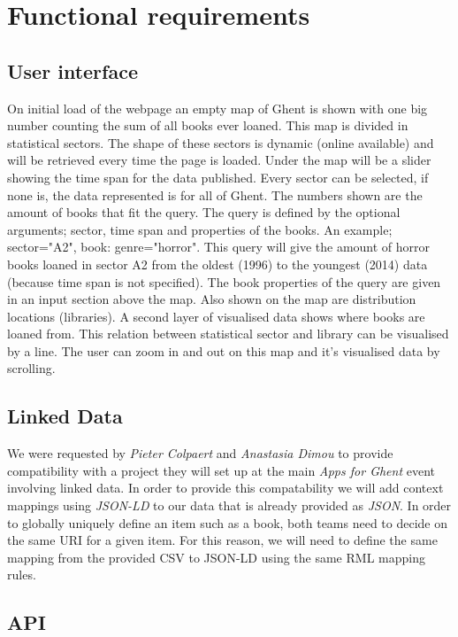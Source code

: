 \section{Functional requirements}

\subsection{User interface}

On initial load of the webpage an empty map of Ghent is shown with one big number counting the sum of all books ever loaned. This map is divided in statistical sectors. The shape of these sectors is dynamic (online available) and will be retrieved every time the page is loaded. Under the map will be a slider showing the time span for the data published. Every sector can be selected, if none is, the data represented is for all of Ghent.  The numbers shown are the amount of books that fit the query. The query is defined by the optional arguments; sector, time span and properties of the books. An example; sector="A2", book: genre="horror". This query will give the amount of horror books loaned in sector A2 from the oldest (1996) to the youngest (2014) data (because time span is not specified). The book properties of the query are given in an input section above the map. Also shown on the map are distribution locations (libraries). A second layer of visualised data shows where books are loaned from. This relation between statistical sector and library can be visualised by a line. The user can zoom in and out on this map and it's visualised data by scrolling.

\subsection{Linked Data}

We were requested by \emph{Pieter Colpaert} and \emph{Anastasia Dimou} to provide compatibility with a project they will set up at the main \emph{Apps for Ghent} event involving linked data. In order to provide this compatability we will add context mappings using \emph{JSON-LD} to our data that is already provided as \emph{JSON}. In order to globally uniquely define an item such as a book, both teams need to decide on the same URI for a given item. For this reason, we will need to define the same mapping from the provided CSV to JSON-LD using the same RML mapping rules.

\subsection{API}


